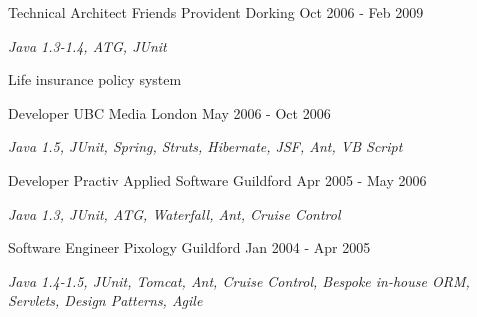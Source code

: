 \begin{cventries}
  \cventry
    {Technical Architect} %
    {Friends Provident} %
    {Dorking} %
    {Oct 2006 - Feb 2009} %
    {
      \begin{cvitems} %
        \item {\itshape{Java 1.3-1.4, ATG, JUnit}}
        \item {Life insurance policy system}
      \end{cvitems}
    }
    
  \cventry
    {Developer} %
    {UBC Media} %
    {London} %
    {May 2006 - Oct 2006} %
    {
      \begin{cvitems} %
        \item {\itshape{Java 1.5, JUnit, Spring, Struts, Hibernate, JSF, Ant, VB Script}}
      \end{cvitems}
    }
    
  \cventry
    {Developer} %
    {Practiv Applied Software} %
    {Guildford} %
    {Apr 2005 - May 2006} %
    {
      \begin{cvitems} %
        \item {\itshape{Java 1.3, JUnit, ATG, Waterfall, Ant, Cruise Control}}
      \end{cvitems}
    }
    
  \cventry
    {Software Engineer} %
    {Pixology} %
    {Guildford} %
    {Jan 2004 - Apr 2005} %
    {
      \begin{cvitems} %
        \item {\itshape{Java 1.4-1.5, JUnit, Tomcat, Ant, Cruise Control, Bespoke in-house ORM, Servlets, Design Patterns, Agile}}
      \end{cvitems}
    }
    

\end{cventries}
